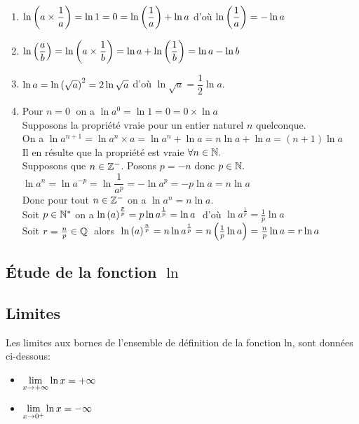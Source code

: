 \begin{enumerate}

\item $ \ln \left(a \times \dfrac{1}{a}\right)=\ln 1 =0 = \ln \left(\dfrac{1}{a}\right)+ \ln a  $ \; d'où   \;$\ln \left(\dfrac{1}{a}\right)= - \ln a$
\item $ \ln \left(\dfrac{a}{b} \right)= \ln \left( a\times \dfrac{1}{b} \right)=\ln a+ \ln \left( \dfrac{1}{b}\right)=\ln a-  \ln b $
\item $ \ln a=\ln \left(\sqrt{a}\right)^{2}=2\ln \sqrt{a} $\; d'où \;$ \ln \sqrt{a} = \dfrac{1}{2} \ln a$.
\item  Pour $ n=0 \;$ on a $ \ln a^{0}=\ln 1 =0=0\times \ln a $ \\ 
Supposons la propriété vraie pour un entier  naturel  $ n $ quelconque.  \\
On a $ \ln a^{n+1} =\ln a^{n}\times a  =\ln a^{n}+\ln a  = n\ln a+\ln a=(n+1)\ln a $ \\
Il en résulte que la propriété est vraie $ \forall n \in \mathbb{N}. $ \\
Supposons que $ n\in\mathbb{Z}^- $.\;   Posons $ p=-n $   donc $ p\in\mathbb{N}. $  \\
$ \ln a^{n}=\ln a^{-p}   =\ln \dfrac{1}{a^{p}}  =-\ln a^{p}=   -p\ln a  =n\ln a $  \\
Donc pour tout $ n\in \mathbb{Z}^- $\; on a $\ln a^{n} = n\ln a  $. \\
Soit  $ p\in \mathbb{N}^* $  on a $ \ln\left( a\right)^{\frac{p}{p}}  =             p\ln a^{\frac{1}{p}}  =\ln a\; $ d'où   $ \ln a^{\frac{1}{p}}=\frac{1}{p} \ln a $    \\  Soit $ r=\frac{n}{p}\in\mathbb{Q} \;$  alors  $\; \ln \left(a\right)^{\frac{n}{p}} =n \ln a^{\frac{1}{p}}  =n \left(\frac{1}{p} \ln a\right)  =\frac{n}{p} \ln a=  r\ln a$ 
\end{enumerate}



\subsection{ Étude de la fonction $\ln $}

\subsection*{Limites}
 Les limites aux bornes de l'ensemble de définition  de  la fonction ln, sont données ci-dessous:


\begin{property}
\begin{itemize}
\item $ \displaystyle\lim_{x \to +\infty}\ln x=+\infty $  
 \item   $\displaystyle \lim_{x \to 0^{+}}\ln x=-\infty $
\end{itemize}
\end{property}

